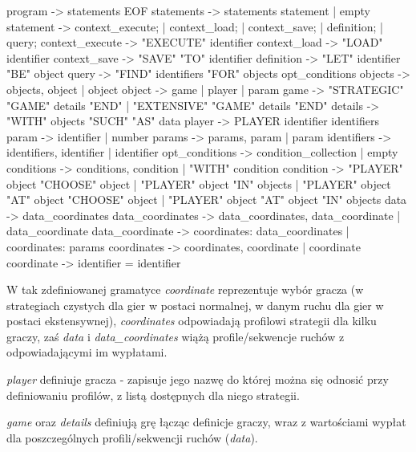 \documentclass[polish]{standalone}
\begin{document}
\begin{code}[caption=Gramatyka,
             label=GRAMMAR,
             literate={->}{$\rightarrow$}{2}
                      {empty}{$\epsilon$}{1}]
program          -> statements EOF
statements       -> statements statement | empty
statement        -> context_execute; | context_load; |
                    context_save; | definition; | query;
context_execute  -> "EXECUTE" identifier
context_load     -> "LOAD" identifier
context_save     -> "SAVE" "TO" identifier
definition       -> "LET" identifier "BE" object
query            -> "FIND" identifiers
                     "FOR" objects opt_conditions
objects          -> objects, object | object
object           -> game | player | param
game             -> "STRATEGIC" "GAME" details "END" |
                    "EXTENSIVE" "GAME" details "END"
details          -> "WITH" objects "SUCH" "AS" data
player           -> PLAYER identifier { identifiers }
param            -> identifier | number
params           -> params, param | param
identifiers      -> identifiers, identifier |
                    identifier
opt_conditions   -> condition_collection | empty
conditions       -> conditions, condition |
                    "WITH" condition
condition        -> "PLAYER" object "CHOOSE" object |
                    "PLAYER" object "IN" { objects } |
                    "PLAYER" object "AT" object
                                    "CHOOSE" object |
                    "PLAYER" object "AT" object
                                    "IN" { objects }
data             -> data_coordinates
data_coordinates -> data_coordinates, data_coordinate |
                    data_coordinate
data_coordinate  -> { coordinates: data_coordinates } |
                    { coordinates: params }
coordinates      -> coordinates, coordinate |
                    coordinate
coordinate       -> identifier = identifier
\end{code}

W tak zdefiniowanej gramatyce \textit{coordinate} reprezentuje wybór gracza (w strategiach czystych dla gier w postaci
normalnej, w danym ruchu dla gier w postaci ekstensywnej), \textit{coordinates} odpowiadają profilowi strategii dla
kilku graczy, zaś \textit{data} i \textit{data\_coordinates} wiążą profile/sekwencje ruchów z odpowiadającymi im
wypłatami.

\textit{player} definiuje gracza - zapisuje jego nazwę do której można się odnosić przy definiowaniu profilów, z listą
dostępnych dla niego strategii.

\textit{game} oraz \textit{details} definiują grę łącząc definicje graczy, wraz z wartościami wypłat dla poszczególnych
profili/sekwencji ruchów (\textit{data}).
\end{document}
